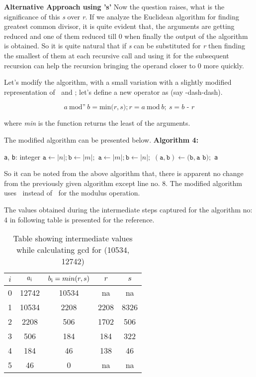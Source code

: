 \documentclass[conference]{IEEEtran}
\newcommand{\var}[1]{\textit{#1}}
\newcommand{\progvar}[1]{\texttt{#1}}
\renewcommand{\mod}{\text{mod}}
\newcommand{\moddash}{\text{mod'}}
\newcommand{\moddashdash}{\text{mod''}}
\begin{document}
\textbf{Alternative Approach using 's'}
Now the question raises, what is the significance of this \var{s} over \var{r}.
If we analyze the Euclidean algorithm for finding greatest common divisor, it is quite evident that, the arguments are getting reduced and one of them reduced till 0 when finally the output of the algorithm is obtained. So it is quite natural that if \var{s} can be substituted  for \var{r} then finding the smallest of them at each recursive call and using it for the subsequent recursion can help the recursion bringing the operand closer to 0 more quickly.

Let's modify the algorithm, with a small variation with a slightly modified representation of \mod $\>$ and \moddash; let's define a new operator as \moddashdash  (say \mod -dash-dash).

\begin{equation} \label{eq:gcd_modulus_1_2}
\var{a} \> \moddashdash  \> \var{b} = \text{min} \var(r, s);
\var{r} = \var{a} \> \mod \> \var{b}; \> \var{s} = \var{b - r}
\end{equation}

where \textit{min} is the function returns the least of the arguments.

The modified algorithm can be presented below.
\newline \textbf{Algorithm 4:}
\begin{algorithmic}[1]
\STATE \progvar{a}, \progvar{b}: integer
	\STATE $\progvar{a} \gets |n|; \progvar{b} \gets |m|;$
\ELSE
	\STATE $\progvar{a} \gets |m|; \progvar{b} \gets |n|;$
\ENDIF
\WHILE{$\progvar{b} > 0$ } 
	\STATE $(\progvar{a}, \progvar{b}) \leftarrow (\progvar{b}, \progvar{a}  $ \moddashdash  $\progvar{b});$
\ENDWHILE
\RETURN \progvar{a}
\end {algorithmic}

So it can be noted from the above algorithm that, there is apparent no change from the previously given algorithm except line no. 8. The modified algorithm uses \moddashdash $\>$ instead of \mod $\>$ for the modulus operation. 

The values obtained during the intermediate steps captured for the algorithm no: 4 in following table is presented for the reference.
\begin{table}[!htbp]
\caption{Table showing intermediate values while calculating gcd for (10534, 12742)}
\label{table:4}
\centering
	\begin{tabular}{c | c | c | c| c}
	\hline
	$i$ & $a\textsubscript{i}$ & $b\textsubscript{i} = min(r,s)$ & $r$ & $s$\\ [0.5ex] 
	\hline
		0 & 12742 & 10534 & na   & na \\ 
		1 & 10534 & 2208  & 2208 & 8326\\  
		2 & 2208  & 506   & 1702 & 506\\
		3 & 506   & 184   & 184  & 322\\
		4 & 184   & 46    & 138  & 46\\
		5 & 46    & 0     & na   & na
	\end{tabular}
\end{table}
\end{document}
